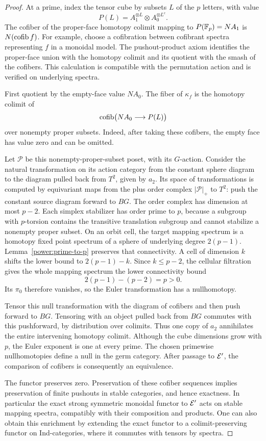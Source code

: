 \begin{proof}
At a prime, index the tensor cube by subsets $L$ of the $p$ letters,
with value
\[
 P(L)=A_1^{\otimes L}\otimes A_0^{\otimes L^c}.
\]
The cofiber of the proper-face homotopy colimit mapping to
$P(\mathbb F_p)=NA_1$ is $N(\operatorname{cofib} f)$. For example, choose a cofibration
between cofibrant spectra representing $f$ in a monoidal model. The
pushout-product axiom identifies the proper-face union with the
homotopy colimit and its quotient with the smash of the cofibers.
This calculation is compatible with the permutation action and is
verified on underlying spectra.

First quotient by the empty-face value $NA_0$. The fiber of
$\kappa_f$ is the homotopy colimit of
\[
 \operatorname{cofib}\bigl(NA_0\longrightarrow P(L)\bigr)
\]
over nonempty proper subsets. Indeed, after taking these cofibers,
the empty face has value zero and can be omitted.

Let $\mathcal P$ be this nonempty-proper-subset poset, with its
$G$-action. Consider the natural transformation on its action category
from the constant sphere diagram to the diagram pulled back from
$T^2$, given by $a_2$. Its space of transformations is computed by
equivariant maps from the plus order complex $|\mathcal P|_+$ to
$T^2$: push the constant source diagram forward to $BG$.
The order complex has dimension at most $p-2$. Each simplex
stabilizer has order prime to $p$, because a subgroup with $p$-torsion
contains the transitive translation subgroup and cannot stabilize a
nonempty proper subset. On an orbit cell, the target mapping
spectrum is a homotopy fixed point spectrum of a sphere of underlying
degree $2(p-1)$. Lemma~\ref{power:prime-to-p} preserves that
connectivity. A cell of dimension $k$ shifts the lower bound to
$2(p-1)-k$. Since $k\leq p-2$, the cellular filtration gives the
whole mapping spectrum the lower connectivity bound
\[
 2(p-1)-(p-2)=p>0.
\]
Its $\pi_0$ therefore vanishes, so the Euler transformation has a
nullhomotopy.

Tensor this null transformation with the diagram of cofibers and
then push forward to $BG$. Tensoring with an object pulled back from
$BG$ commutes with this pushforward, by distribution over colimits.
Thus one copy of $a_2$ annihilates the entire intervening homotopy
colimit. Although the cube dimensions grow with $p$, the Euler
exponent is one at every prime. The chosen primewise nullhomotopies
define a null in the germ category. After passage to $\mathcal E'$, the
comparison of cofibers is consequently an equivalence.

The functor preserves zero. Preservation of these cofiber sequences
implies preservation of finite pushouts in stable categories, and
hence exactness. In particular the exact strong symmetric monoidal
functor to $\mathcal E'$ acts on stable mapping spectra, compatibly with
their composition and products. One can also obtain this enrichment
by extending the exact functor to a colimit-preserving functor on
Ind-categories, where it commutes with tensors by spectra.
\end{proof}

